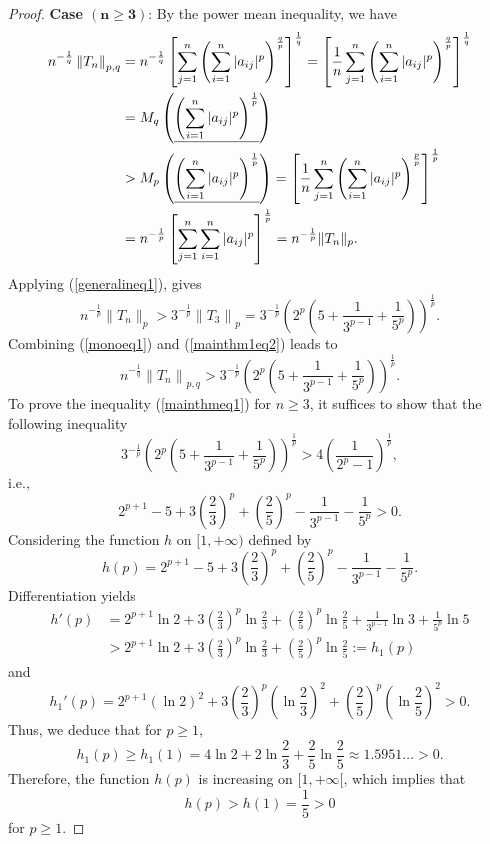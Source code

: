 \documentclass{amsart}
\begin{document}
\begin{proof} {\bf Case $\boldsymbol{(n\geq3)}$}: By the power mean inequality, we have
\begin{align}\label{monoeq1}
n^{-\frac{1}{q}}\left\|T_{n}\right\|_{p,q}&=n^{-\frac{1}{q}}\left[\sum_{j=1}^n\left(\sum_{i=1}^n|a_{ij}|^p\right)^\frac{q}{p}\right]^\frac{1}{q}=\left[\frac{1}{n}\sum_{j=1}^n\left(\sum_{i=1}^n|a_{ij}|^p\right)^\frac{q}{p}\right]^\frac{1}{q}\notag\\
&=M_q\left(\underline{\left(\sum_{i=1}^n|a_{ij}|^p\right)^\frac{1}{p}}\right)\notag\\
&>M_p\left(\underline{\left(\sum_{i=1}^n|a_{ij}|^p\right)^\frac{1}{p}}\right)=\left[\frac{1}{n}\sum_{j=1}^n\left(\sum_{i=1}^n|a_{ij}|^p\right)^\frac{p}{p}\right]^\frac{1}{p}\notag\\
&=n^{-\frac{1}{p}}\left[\sum_{j=1}^n\sum_{i=1}^n|a_{ij}|^p\right]^\frac{1}{p}=n^{-\frac{1}{p}}\|T_n\|_p.
\end{align}  
Applying  (\ref{generalineq1}), gives
\begin{equation}\label{mainthm1eq2}
n^{-\frac{1}{p}}\|T_n\|_p>3^{-\frac{1}{p}}\left\|T_{3}\right\|_{p}=3^{-\frac{1}{p}}\left(2^{p}\left(5+\frac{1}{3^{p-1}}+\frac{1}{5^{p}}\right)\right)^{\frac{1}{p}}.
\end{equation}
Combining (\ref{monoeq1}) and (\ref{mainthm1eq2}) leads to
$$
n^{-\frac{1}{q}}\left\|T_{n}\right\|_{p,q} >3^{-\frac{1}{p}}\left(2^{p}\left(5+\frac{1}{3^{p-1}}+\frac{1}{5^{p}}\right)\right)^{\frac{1}{p}}.
$$
To prove the inequality (\ref{mainthmeq1}) for $n\geq3$, it suffices to show that the following inequality
$$
3^{-\frac{1}{p}}\left(2^{p}\left(5+\frac{1}{3^{p-1}}+\frac{1}{5^{p}}\right)\right)^{\frac{1}{p}}>4\left(\frac{1}{2^{p}-1}\right)^{\frac{1}{p}},
$$
i.e.,
$$
2^{p+1}-5+3\left(\frac{2}{3}\right)^{p}+\left(\frac{2}{5}\right)^{p}-\frac{1}{3^{p-1}}-\frac{1}{5^p}>0.
$$
Considering the function $h$ on $[1,+\infty)$ defined by 
$$
h(p)=2^{p+1}-5+3\left(\frac{2}{3}\right)^{p}+\left(\frac{2}{5}\right)^{p}-\frac{1}{3^{p-1}}-\frac{1}{5^p}.
$$
Differentiation yields
\begin{align*}
h'(p)&=2^{p+1} \ln 2+3\left(\frac{2}{3}\right)^{p} \ln \frac{2}{3}+\left(\frac{2}{5}\right)^{p} \ln \frac{2}{5}+\frac{1}{3^{p-1}}\ln3+\frac{1}{5^p}\ln 5\\
&>2^{p+1} \ln 2+3\left(\frac{2}{3}\right)^{p} \ln \frac{2}{3}+\left(\frac{2}{5}\right)^{p} \ln \frac{2}{5}:=h_1(p)
\end{align*}
and 
$$
h_1'(p)=  2^{p+1} (\ln 2)^2+3\left(\frac{2}{3}\right)^{p} \left(\ln \frac{2}{3}\right)^2+\left(\frac{2}{5}\right)^{p} \left(\ln \frac{2}{5}\right)^2>0.
$$
Thus, we deduce that for $p\geq1$,
 $$
h_1(p) \geq h_1(1)=4\ln 2+2\ln \frac{2}{3}+\frac{2}{5}\ln \frac{2}{5}\approx1.5951\ldots>0.
$$
Therefore, the function $h(p)$ is increasing on $[1,+\infty[$,  which implies that 
$$h(p)>h(1)=\frac{1}{5}>0$$
for $p\geq1$.


\end{proof}
\end{document}

